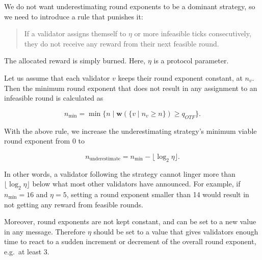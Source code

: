 We do not want underestimating round exponents to be a dominant strategy, so we need to introduce a rule that punishes it:

\begin{quote}
If a validator assigns themself to $\eta$ or more infeasible ticks consecutively, they do not receive any reward from their next feasible round.
\end{quote}

The allocated reward is simply burned. Here, $\eta$ is a protocol parameter.

Let us assume that each validator $v$ keeps their round exponent constant, at $n_v$. Then the minimum round exponent that does not result in any assignment to an infeasible round is calculated as

\begin{equation}
  n_{\min} = \min\{n \mid  \boldsymbol{w}(\{v\mid n_v \geq n\}) \geq q_{OTF} \}.
\end{equation}

With the above rule, we increase the underestimating strategy's minimum viable round exponent from 0 to

\begin{equation}
  n_\text{underestimate} = n_{\min}-\lfloor \log_2\eta\rfloor.
\end{equation}

In other words, a validator following the strategy cannot linger more than $\lfloor \log_2\eta\rfloor$ below what most other validators have announced. For example, if $n_{\min}=16$ and $\eta = 5$, setting a round exponent smaller than 14 would result in not getting any reward from feasible rounds.

Moreover, round exponents are not kept constant, and can be set to a new value in any message. Therefore $\eta$ should be set to a value that gives validators enough time to react to a sudden increment or decrement of the overall round exponent, e.g.~at least 3.

